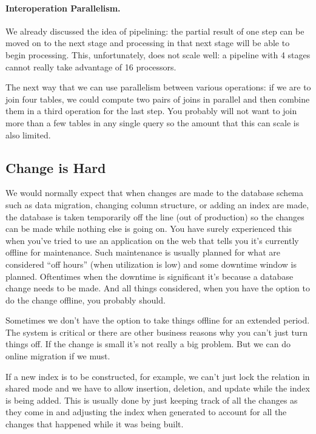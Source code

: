 \paragraph{Interoperation Parallelism.}

We already discussed the idea of pipelining: the partial result of one step can be moved on to the next stage and processing in that next stage will be able to begin processing. This, unfortunately, does not scale well: a pipeline with 4 stages cannot really take advantage of 16 processors.

The next way that we can use parallelism between various operations: if we are to join four tables, we could compute two pairs of joins in parallel and then combine them in a third operation for the last step. You probably will not want to join more than a few tables in any single query so the amount that this can scale is also limited.

\subsection*{Change is Hard}

We would normally expect that when changes are made to the database schema such as data migration, changing column structure, or adding an index are made, the database is taken temporarily off the line (out of production) so the changes can be made while nothing else is going on. You have surely experienced this when you've tried to use an application on the web that tells you it's currently offline for maintenance. Such maintenance is usually planned for what are considered ``off hours'' (when utilization is low) and some downtime window is planned. Oftentimes when the downtime is significant it's because a database change needs to be made. And all things considered, when you have the option to do the change offline, you probably should.

Sometimes we don't have the option to take things offline for an extended period. The system is critical or there are other business reasons why you can't just turn things off. If the change is small it's not really a big problem. But we can do online migration if we must. 

If a new index is to be constructed, for example, we can't just lock the relation in shared mode and we have to allow insertion, deletion, and update while the index is being added. This is usually done by just keeping track of all the changes as they come in and adjusting the index when generated to account for all the changes that happened while it was being built.


